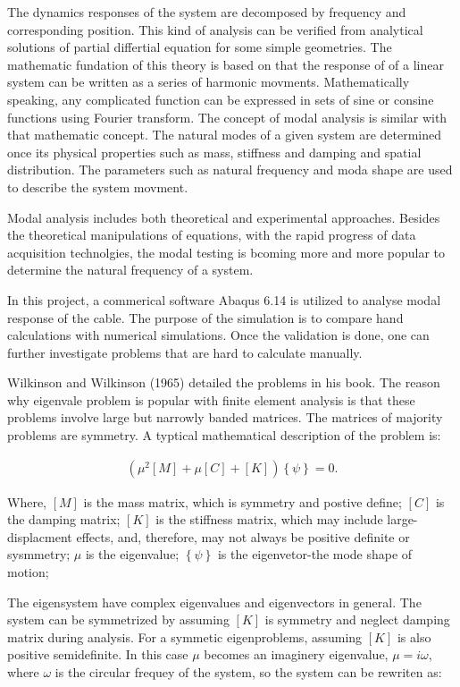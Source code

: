 \documentclass[paper=a4, fontsize=11pt]{scrartcl} %
\numberwithin{equation}{section} %
\numberwithin{figure}{section} %
\numberwithin{table}{section} %
\begin{document}
The dynamics responses of the system are decomposed by frequency and
corresponding position. This kind of analysis can be verified from
analytical solutions of partial differtial equation for some simple
geometries. The mathematic fundation of this theory is based on that
the response of of a linear system can be written as a series of
harmonic movments. Mathematically speaking, any complicated function
can be expressed in sets of sine or consine functions using Fourier
transform. The concept of modal analysis is similar with that
mathematic concept. The natural modes of a given system are determined
once its physical properties such as mass, stiffness and damping and
spatial distribution. The parameters such as natural frequency and
moda shape are used to describe the system movment.

Modal analysis includes both theoretical and experimental approaches.
Besides the theoretical manipulations of equations, with the rapid
progress of data acquisition technolgies, the modal testing is bcoming
more and more popular to determine the natural frequency of a system.

In this project, a commerical software Abaqus 6.14 is utilized to
analyse modal response of the cable. The purpose of the simulation is
to compare hand calculations with numerical simulations. Once the
validation is done, one can further investigate problems that are hard
to calculate manually.

Wilkinson and Wilkinson (1965) detailed the problems in his book. The
reason why eigenvale problem is popular with finite element analysis
is that these problems involve large but narrowly banded matrices. The
matrices of majority problems are symmetry. A typtical mathematical
description of the problem is:

\begin{align}
\left(\mu^2\left[M\right]+\mu\left[C\right]+\left[K\right]\right)\left\{\psi\right\}=0.
\end{align}

Where, $[M]$ is the mass matrix, which is symmetry and postive define;
$[C]$ is the damping matrix; $[K]$ is the stiffness matrix, which may
include large-displacment effects, and, therefore, may not always be
positive definite or sysmmetry; $\mu$ is the eigenvalue;
$\left\{\psi\right\}$ is the eigenvetor-the mode shape of motion;

The eigensystem have complex eigenvalues and eigenvectors in general.
The system can be symmetrized by assuming $[K]$ is symmetry and neglect
damping matrix during analysis. For a symmetic eigenproblems, assuming
$[K]$ is also positive semidefinite. In this case $\mu$ becomes an
imaginery eigenvalue, $\mu=i\omega$, where $\omega$ is the circular
frequey of the system, so the system can be rewriten as:
\end{document}
